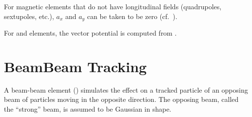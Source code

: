 For magnetic elements that do not have longitudinal fields
(quadrupoles, sextupoles, etc.), $a_x$ and $a_y$ can be taken to be
zero (cf.~).

For  and  elements, the vector potential is computed from
.

\section{BeamBeam Tracking}
\label{s:beambeam.std}

A beam-beam element () simulates the effect on a tracked particle of an opposing
beam of particles moving in the opposite direction. The opposing beam, called the ``strong'' beam,
is assumed to be Gaussian in shape.

